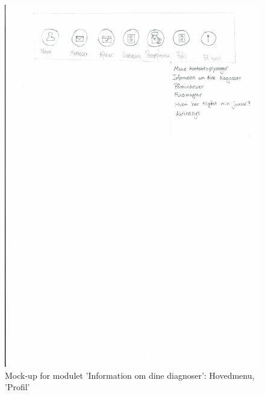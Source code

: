 \begin{figure}[H]
	\centering
	\includegraphics[angle=0, height=0.3\textheight]{Materials/Information_Hovedmenu.pdf}
	\caption{Mock-up for modulet 'Information om dine diagnoser': Hovedmenu, 'Profil'}
	\label{fig:Mock-Up}
\end{figure}
